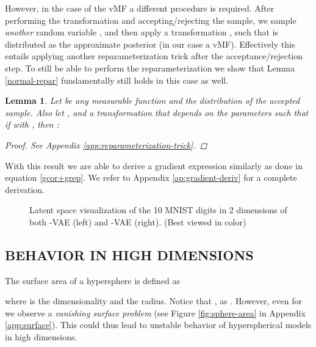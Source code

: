 \documentclass[letterpaper]{article}
\newtheorem{lem}{\textbf{Lemma}}
\begin{document}
However, in the case of the vMF a different procedure is required. After performing the transformation  and accepting/rejecting the sample, we sample \textit{another} random variable , and then apply a transformation , such that  is distributed as the approximate posterior (in our case a vMF). Effectively this entails applying another reparameterization trick after the acceptance/rejection step. To still be able to perform the reparameterization we show that Lemma \ref{normal-repar} fundamentally still holds in this case as well.
\begin{lem}\label{our-repar}
Let  be any measurable function and  the distribution of the accepted sample. 
Also let , and  a transformation that depends on the parameters such that if  with , then :

\begin{proof}
    See Appendix \ref{app:reparameterization-trick}.
\end{proof}
\end{lem}
With this result we are able to derive a gradient expression similarly as done in equation \ref{gcor+grep}. We refer to Appendix \ref{ap:gradient-deriv} for a complete derivation. 

\begin{figure*}[t]
\centering
     \hspace{5em}
      \caption{Latent space visualization of the 10 MNIST digits in 2 dimensions of both -VAE (left) and -VAE (right). (Best viewed in color)}
      \label{fig:latent_mnist_z2}
\end{figure*}

\subsection{BEHAVIOR IN HIGH DIMENSIONS}\label{subsec:high-dim}
The surface area of a hypersphere is defined as

where  is the dimensionality and  the radius. Notice that , as . However, even for  we observe a \textit{vanishing surface problem} (see Figure \ref{fig:sphere-area} in Appendix \ref{app:surface}). This could thus lead to unstable behavior of hyperspherical models in high dimensions.
\end{document}
